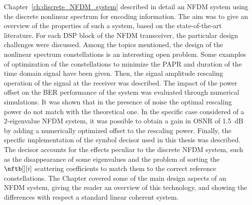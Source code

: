 Chapter~\ref{ch:discrete_NFDM_system} described in detail an \ac{NFDM} system using
the discrete nonlinear spectrum for encoding information. The aim was to give an
overview of the properties of such a system, based on the state-of-the-art
literature. For each \ac{DSP} block of the \ac{NFDM} transceiver, the particular design
challenges were discussed. Among the topics mentioned, the design of the
nonlinear spectrum constellations is an interesting open problem. Some examples
of optimization of the constellations to minimize the \ac{PAPR} and duration of
the time domain signal have been given. Then, the signal amplitude rescaling  operation of
the signal at the receiver was described. The impact of the power offset on the
BER performance of the system was evaluated through numerical simulations.
It was shown that in the presence of noise the optimal rescaling power do not
match with the theoretical one. In the specific case considered of a 2-eigenvalue \ac{NFDM} system, it was possible to obtain a gain in \ac{OSNR} of \SI{1.5}{\dB} by adding a numerically optimized offset to the rescaling power. Finally, the specific implementation of the
symbol decisor used in this thesis was described. The decisor accounts for the
effects peculiar to the discrete \ac{NFDM} system, such as the disappearance of
some eigenvalues and the problem of sorting the $\nftb[][i]$ scattering coefficients
to match them to the correct reference constellations. The Chapter
covered some of the main design aspects of an \ac{NFDM} system, giving the reader an overview of this technology, and showing the differences
with respect a standard linear coherent system.

